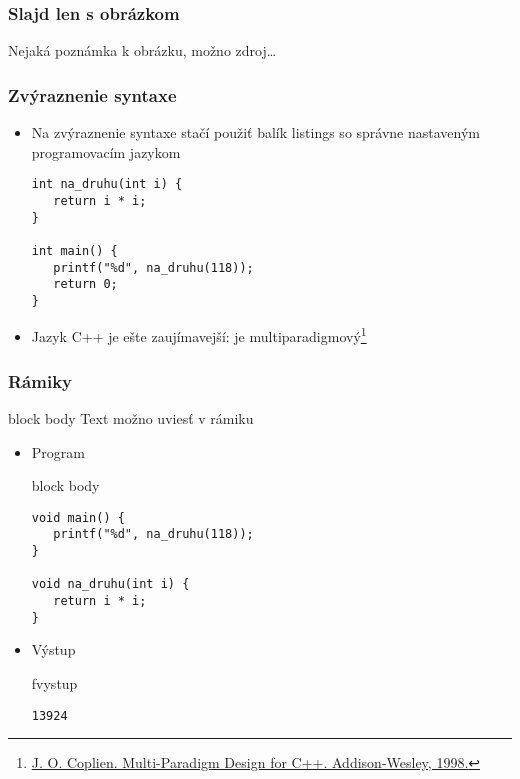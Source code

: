 \documentclass{beamer}
\newcommand{\footcite}[1]{\footnote{\tiny #1}}
\newenvironment{program}{\begin{beamercolorbox}[rounded=true,shadow=true]{block body}\vspace{-4mm}}{\vspace{-2mm}\end{beamercolorbox}}
\newenvironment{vystup}{\begin{beamercolorbox}[rounded=true,shadow=true]{fvystup}}{\end{beamercolorbox}}
\newenvironment{poznamka}{\begin{beamercolorbox}[rounded=true,shadow=false]{block body}}{\end{beamercolorbox}}
\begin{document}
\begin{frame}[fragile=singleslide]\frametitle{Slajd len s obrázkom}

{\tiny Nejaká poznámka k obrázku, možno zdroj\ldots}
\end{frame}


\begin{frame}[fragile=singleslide]\frametitle{Zvýraznenie syntaxe}
\begin{itemize}
\item Na zvýraznenie syntaxe stačí použiť balík listings so správne nastaveným programovacím jazykom
\begin{lstlisting}
int na_druhu(int i) {
   return i * i;
}

int main() {
   printf("%d", na_druhu(118));
   return 0;
}
\end{lstlisting}

\item Jazyk C++ je ešte zaujímavejší: je multiparadigmový\footcite{\url{J. O. Coplien. Multi-Paradigm Design for C++. Addison-Wesley, 1998.}}
\end{itemize}
\end{frame}


\begin{frame}[fragile=singleslide]\frametitle{Rámiky}
\begin{poznamka}
Text možno uviesť v rámiku
\end{poznamka}

\begin{itemize}
\item Program

\begin{program}
\begin{lstlisting}
void main() {
   printf("%d", na_druhu(118));
}

void na_druhu(int i) {
   return i * i;
}
\end{lstlisting}
\end{program}

\item Výstup
\begin{vystup}
\begin{lstlisting}
13924
\end{lstlisting}
\end{vystup}

\end{itemize}
\end{frame}
\end{document}
